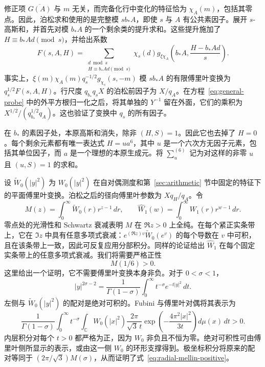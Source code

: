 \documentclass[11pt,a4paper]{article}
\numberwithin{equation}{section}
\numberwithin{figure}{section}
\theoremstyle{definition}
\theoremstyle{remark}
\begin{document}
修正项 $\overline{G(A)}$ 与 $m$ 无关，而完备化行中变化的特征恰为 $\chi_A(m)$，包括其零点。因此，泊松求和使用的是完整模 $sb_*A$，即使 $s$ 与 $A$ 有公共素因子。展开 $s$-高斯和，并首先对模 $b_*A$ 的一个剩余类的提升求和。这些提升施加了 $H\equiv b_*Ad\pmod s$，并给出系数
\begin{equation}\label{eq:local-F}
 F(s,A,H)=\sum_{\substack{d\bmod s\\H\equiv b_*Ad\pmod s}}
 \chi_s(d)g_{\xi\chi_A}\!\left(b_*A,\frac{H-b_*Ad}{s}\right).
\end{equation}
事实上，$\xi(m)\chi_A(m)q_s^{-1/2}g_{\chi_s}(s,-m)$ 模 $sb_*A$ 的有限傅里叶变换为 $q_s^{1/2}F(s,A,H)$。行尺度 $q_{b_*}q_sX$ 的泊松前因子为 $X/q_A$。在方程~\eqref{eq:general-probe} 中的外平方根归一化之后，将其单独的 $Y^{-1}$ 留在外面，它们的乘积为 $X^{1/2}/(q_{b_*}^{1/2}q_A)$。这也验证了变换中 $q_s$ 的所有因子。

在 $b_*$ 的素因子处，本原高斯和消失，除非 $(H,S)=1$。因此它也去掉了 $H=0$。每个剩余元素都有唯一表达式 $H=ua^6$，其中 $u$ 是一个六次方无因子元素，包括其单位因子，而 $a$ 是一个理想的本原生成元。将 $\sum_u^{(6)}$ 记为对这样的非零 $u$ 且 $(u,S)=1$ 的求和。

设 $\widetilde W_0(|y|^2)$ 为 $W_0(|y|^2)$ 在自对偶测度和第~\ref{sec:arithmetic} 节中固定的特征下的平面傅里叶变换。泊松之后的径向傅里叶参数为 $Xq_H/q_A$。令
\[
 M(z)=\int_0^\infty\widetilde W_0(r)r^{z-1}\,dr,
 \qquad
 \widehat W_1(w)=\int_0^\infty W_1(r)r^{w-1}\,dr.
\]
零点处的光滑性和 Schwartz 衰减表明 $M$ 在 $\Re z>0$ 上全纯。在每个紧正实条带上，它在 $\Im z$ 中具有任意多项式衰减：$e^{(\Re z)v}\widetilde W_0(e^v)$ 的每个导数在 $v$ 中可积，且在该条带上一致，因此可反复应用分部积分。同样的论证给出 $\widehat W_1$ 在每个固定实条带上的任意多项式衰减。我们将需要严格正性
\begin{equation}\label{eq:radial-mellin-positive}
 M(1/6)>0.
\end{equation}
这里给出一个证明，它不需要傅里叶变换本身非负。对于 $0<\sigma<1$，
\[
 |y|^{2\sigma-2}=\frac1{\Gamma(1-\sigma)}
             \int_0^\infty t^{-\sigma}e^{-t|y|^2}\,dt.
\]
左侧与 $\widetilde W_0(|y|^2)$ 的配对是绝对可积的。Fubini 与傅里叶对偶将其表示为
\[
 \frac1{\Gamma(1-\sigma)}\int_0^\infty t^{-\sigma}
 \int_{\mathbb C}W_0(|x|^2)
       \frac{2\pi}{\sqrt3\,t}
       \exp\!\left(-\frac{4\pi^2|x|^2}{3t}\right)
                  d\mu(x)\,dt>0.
\]
内层积分对每个 $t>0$ 都严格为正，因为 $W_0$ 非负且不恒为零。绝对可积性可由傅里叶侧所显示的表示，或由这一侧 $W_0$ 的环形支撑得到。极坐标积分将原来的配对等同于 $(2\pi/\sqrt3)M(\sigma)$，从而证明了式~\eqref{eq:radial-mellin-positive}。
\end{document}
